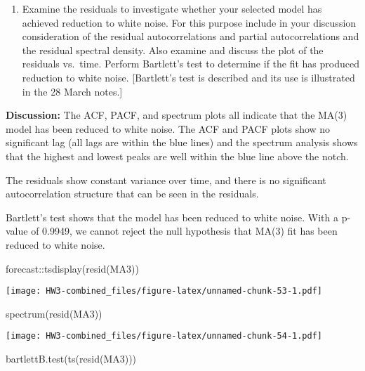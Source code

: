 \documentclass[
]{article}
\newenvironment{Shaded}{\begin{snugshade}}{\end{snugshade}}
\newcommand{\FunctionTok}[1]{\textcolor[rgb]{0.00,0.00,0.00}{#1}}
\newcommand{\NormalTok}[1]{#1}
\newcommand{\SpecialCharTok}[1]{\textcolor[rgb]{0.00,0.00,0.00}{#1}}
\providecommand{\tightlist}{%
  \setlength{\itemsep}{0pt}\setlength{\parskip}{0pt}}
\begin{document}
\begin{enumerate}
\def\labelenumi{(\roman{enumi})}
\setcounter{enumi}{3}
\tightlist
\item
  Examine the residuals to investigate whether your selected model has
  achieved reduction to white noise. For this purpose include in your
  discussion consideration of the residual autocorrelations and partial
  autocorrelations and the residual spectral density. Also examine and
  discuss the plot of the residuals vs.~time. Perform Bartlett's test to
  determine if the fit has produced reduction to white noise.
  {[}Bartlett's test is described and its use is illustrated in the 28
  March notes.{]}
\end{enumerate}

\textbf{Discussion:} The ACF, PACF, and spectrum plots all indicate that
the MA(3) model has been reduced to white noise. The ACF and PACF plots
show no significant lag (all lags are within the blue lines) and the
spectrum analysis shows that the highest and lowest peaks are well
within the blue line above the notch.

The residuals show constant variance over time, and there is no
significant autocorrelation structure that can be seen in the residuals.

Bartlett's test shows that the model has been reduced to white noise.
With a p-value of 0.9949, we cannot reject the null hypothesis that
MA(3) fit has been reduced to white noise.

\begin{Shaded}
\begin{Highlighting}[]
\NormalTok{forecast}\SpecialCharTok{::}\FunctionTok{tsdisplay}\NormalTok{(}\FunctionTok{resid}\NormalTok{(MA3))}
\end{Highlighting}
\end{Shaded}

\texttt{[image: HW3-combined\_files/figure-latex/unnamed-chunk-53-1.pdf]}

\begin{Shaded}
\begin{Highlighting}[]
\FunctionTok{spectrum}\NormalTok{(}\FunctionTok{resid}\NormalTok{(MA3))}
\end{Highlighting}
\end{Shaded}

\texttt{[image: HW3-combined\_files/figure-latex/unnamed-chunk-54-1.pdf]}

\begin{Shaded}
\begin{Highlighting}[]
\FunctionTok{bartlettB.test}\NormalTok{(}\FunctionTok{ts}\NormalTok{(}\FunctionTok{resid}\NormalTok{(MA3)))}
\end{Highlighting}
\end{Shaded}
\end{document}

